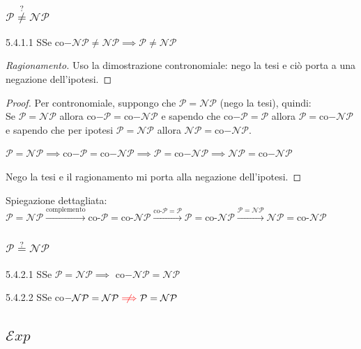 \documentclass{article}  %
\theoremstyle{definition}
\newenvironment{ragionamento}[1][]
  {\begin{proof}[Ragionamento#1]\renewcommand{\qedsymbol}{}\normalfont}
  {\end{proof}}
\begin{document}
\subsubsection{$\mathcal{P} \overset{?}{\neq} \mathcal{NP}$}
\begin{theorem}{5.4.1.1}
	SSe co$-\mathcal{NP} \neq \mathcal{NP} \implies \mathcal{P} \neq \mathcal{NP}$
	\footnotesize
	\begin{ragionamento}
		Uso la dimostrazione contronomiale: nego la tesi e ciò porta a una negazione dell'ipotesi.
	\end{ragionamento}
	\begin{proof}
		Per contronomiale, suppongo che $\mathcal{P}=\mathcal{NP}$ (nego la tesi), quindi: \\
		Se $\mathcal{P}=\mathcal{NP}$ allora co$-\mathcal{P}=$co$-\mathcal{NP}$ e sapendo che co$-\mathcal{P}=\mathcal{P}$
		allora $\mathcal{P}=$co$-\mathcal{NP}$ e sapendo che per ipotesi $\mathcal{P}=\mathcal{NP}$ allora $\mathcal{NP}=$co$-\mathcal{NP}$.\\
		\begin{center}
			$\mathcal{P}=\mathcal{NP}\implies$co$-\mathcal{P}=$co$-\mathcal{NP}\implies\mathcal{P}=$co$-\mathcal{NP}\implies\mathcal{NP}=$co$-\mathcal{NP}$
		\end{center}
		Nego la tesi e il ragionamento mi porta alla negazione dell'ipotesi.
	\end{proof}
	Spiegazione dettagliata: \\
	$		\mathcal{P} = \mathcal{NP}
		\xrightarrow{\text{complemento}}
		\text{co-}\mathcal{P} = \text{co-}\mathcal{NP}
		\xrightarrow{\text{co-}\mathcal{P} = \mathcal{P}}
		\mathcal{P} = \text{co-}\mathcal{NP}
		\xrightarrow{\mathcal{P}=\mathcal{NP}}
		\mathcal{NP} = \text{co-}\mathcal{NP}$
\end{theorem}
\subsubsection{$\mathcal{P} \overset{?}{=} \mathcal{NP}$}
\begin{theorem}{5.4.2.1}
	SSe $\mathcal{P}=\mathcal{NP} \implies$ co$-\mathcal{NP}=\mathcal{NP}$
\end{theorem}
\begin{theorem}{5.4.2.2}
	SSe co$-\mathcal{NP}=\mathcal{NP} \textcolor{red}{\centernot\implies} \mathcal{P}=\mathcal{NP}$
\end{theorem}
\subsection{$\mathcal{E}xp$}
\end{document}
